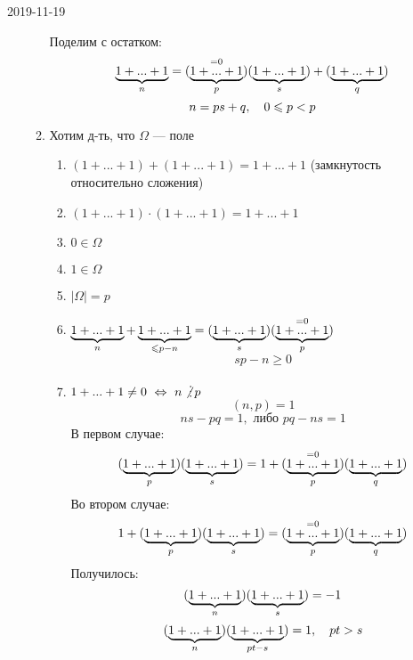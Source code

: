 \documentclass[main.tex]{subfiles}
\begin{document}
\begin{lect}{2019-11-19}
\begin{utv}
\begin{enumerate}
\begin{enumerate}
            Поделим с остатком:
            \[\ub{n}{1+...+1} = (\os{=0}{\ub{p}{1+...+1}})(\ub{s}{1+...+1})+(\ub{q}{1+...+1})\]
            \[n = ps + q,\q 0 \leq p < p\]
            \item Хотим д-ть, что $\Omega$ --- поле
            \begin{enumerate}
              \item $(1+...+1) + (1+...+1) = 1+...+1$ (замкнутость относительно сложения)
              \item $(1+...+1) \cdot (1+...+1) = 1+...+1$
              \item $0 \in \Omega$
              \item $1 \in \Omega$
              \item $|\Omega| = p$
              \item $\ub{n}{1+...+1} + \ub{\leq p-n}{1+...+1} = (\ub{s}{1+...+1})(\os{=0}{\ub{p}{1+...+1}})$
              \[sp - n \geq 0\]
              \item $1+...+1 \neq 0\ \lra \ n \not \devides p$
              \[(n,p) = 1\]
              \[ns - pq = 1, \text{ либо } pq - ns = 1\]
              В первом случае:
              \[(\ub{p}{1+...+1})(\ub{s}{1+...+1}) = 1 + (\os{=0}{\ub{p}{1+...+1}})(\ub{q}{1+...+1})\]
              Во втором случае:
              \[1 + (\ub{p}{1+...+1})(\ub{s}{1+...+1}) = (\os{=0}{\ub{p}{1+...+1}})(\ub{q}{1+...+1})\]
              Получилось:
              \[(\ub{n}{1+...+1})(\ub{s}{1+...+1}) = -1\]
              \[(\ub{n}{1+...+1})(\ub{pt-s}{1+...+1})=1,\q pt > s\]
            \end{enumerate}
          \end{enumerate}
        \end{enumerate}
    \end{utv}
\end{lect}
\end{document}
